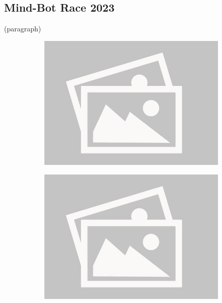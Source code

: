 \documentclass[a4paper,12pt]{report}
\begin{document}
\begin{figure}[H]
\begin{subfigure}{0.32\linewidth}
    \end{subfigure}
\end{figure}

\vspace{-1.8cm}

\subsection{Mind-Bot Race 2023}
(paragraph)

\begin{figure}[H]
    \centering
    \begin{subfigure}{0.42\linewidth}
        \includegraphics[width=0.99\linewidth]{./photos/placeholder.jpg}
    \end{subfigure}
    \begin{subfigure}{0.42\linewidth}
        \includegraphics[width=0.99\linewidth]{./photos/placeholder.jpg}
    \end{subfigure}
\end{figure}
\newpage
\end{document}
